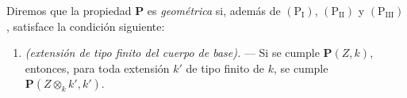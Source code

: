 
\begin{env}[7.3.6]
\label{IV.2.s7.3.6-fr}
Diremos que la propiedad $\boldsymbol P$ es \emph{geométrica} si,
además de $(\mathrm P_{\mathrm I})$,
$(\mathrm P_{\mathrm{II}})$ y $(\mathrm P_{\mathrm{III}})$,
satisface la condición siguiente:
\begin{enumerate}
\item[$(\mathrm P_{\mathrm{IV}})$] \emph{(extensión de tipo finito del
cuerpo de base).} --- Si se cumple $\boldsymbol P(Z,k)$, entonces,
para toda extensión $k'$ de tipo finito de $k$, se cumple
$\boldsymbol P(Z\otimes_k k',k')$.
\end{enumerate}
\end{env}
